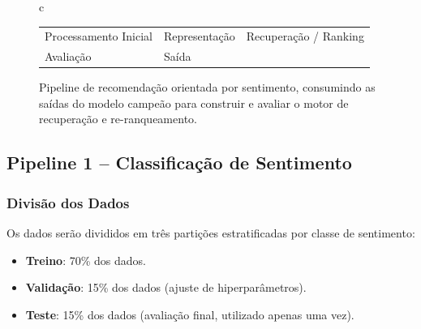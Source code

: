 \documentclass{IEEEtran}
\begin{document}
\begin{figure}[htbp]
\begin{tabular}{c}
    \begin{tabular}{lll}
      \fcolorbox{black}{colorIngestao}{\rule{0pt}{4pt}\rule{4pt}{0pt}} \footnotesize Processamento Inicial &
      \fcolorbox{black}{colorRepres}{\rule{0pt}{4pt}\rule{4pt}{0pt}} \footnotesize Representação &
      \fcolorbox{black}{colorClassif}{\rule{0pt}{4pt}\rule{4pt}{0pt}} \footnotesize Recuperação / Ranking \\
      \fcolorbox{black}{colorAvaliacao}{\rule{0pt}{4pt}\rule{4pt}{0pt}} \footnotesize Avaliação &
      \fcolorbox{black}{colorSaida}{\rule{0pt}{4pt}\rule{4pt}{0pt}} \footnotesize Saída &
    \end{tabular}

  \end{tabular}
  \caption{Pipeline de recomendação orientada por sentimento, consumindo as saídas do modelo campeão para construir e avaliar o motor de recuperação e re-ranqueamento.}
  \label{fig:pipeline_recommendation}
\end{figure}



\subsection{Pipeline 1 -- Classificação de Sentimento}
\label{subsec:pipeline1}

\subsubsection{Divisão dos Dados}
\label{subsubsec:split}

Os dados serão divididos em três partições estratificadas por classe de sentimento:

\begin{itemize}[noitemsep]
  \item \textbf{Treino}: 70\% dos dados.
  \item \textbf{Validação}: 15\% dos dados (ajuste de hiperparâmetros).
  \item \textbf{Teste}: 15\% dos dados (avaliação final, utilizado apenas uma vez).
\end{itemize}
\end{document}
